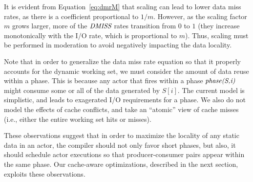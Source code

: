 It is evident from Equation~\ref{eq:dmrM} that scaling can lead to
lower data miss rates, as there is a coefficient proportional to
$1/m$.  However, as the scaling factor $m$ grows larger, more of the
$\mbox{\it DMISS}$ rates transition from $0$ to $1$ (they increase
monotonically with the I/O rate, which is proportional to $m$).  Thus,
scaling must be performed in moderation to avoid negatively impacting
the data locality.

Note that in order to generalize the data miss rate equation so that it properly
accounts for the dynamic working set, we must consider the amount of
data reuse within a phase. This is because any actor that fires within
a phase $\mbox{\it phase(S,i)}$ might consume some or all of the data
generated by $S[i]$. The current model is simplistic, and leads to
exagerated I/O requirements for a phase. We also do not model the
effects of cache conflicts, and take an ``atomic'' view of cache
misses (i.e., either the entire working set hits or misses).

These observations suggest that in order to maximize the locality of
any static data in an actor, the compiler should not only favor short
phases, but also, it should schedule actor executions so that
producer-consumer pairs appear within the same phase. Our cache-aware
optimizations, described in the next section, exploits these
observations.
